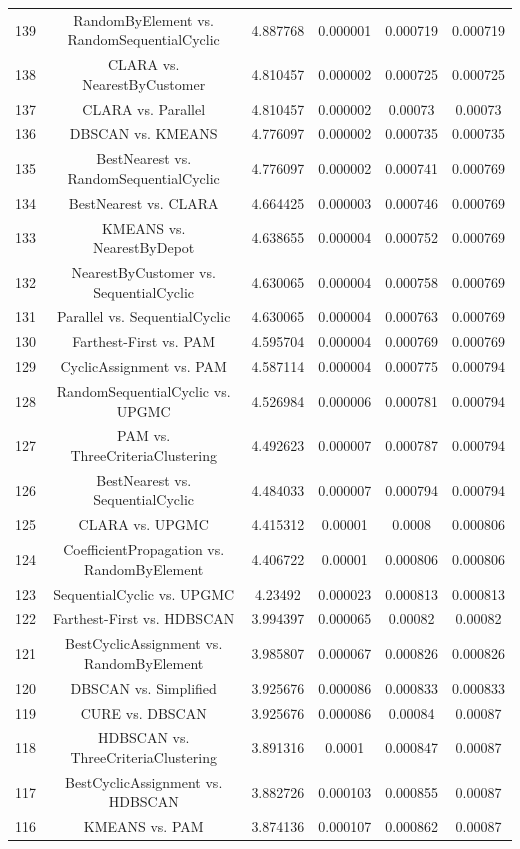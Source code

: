\documentclass[a4paper,10pt]{article}
\begin{document}
\begin{landscape}
\begin{table}[!htp]
\begin{tabular}{cccccc}
139&RandomByElement vs. RandomSequentialCyclic&4.887768&0.000001&0.000719&0.000719\\
138&CLARA vs. NearestByCustomer&4.810457&0.000002&0.000725&0.000725\\
137&CLARA vs. Parallel&4.810457&0.000002&0.00073&0.00073\\
136&DBSCAN vs. KMEANS&4.776097&0.000002&0.000735&0.000735\\
135&BestNearest vs. RandomSequentialCyclic&4.776097&0.000002&0.000741&0.000769\\
134&BestNearest vs. CLARA&4.664425&0.000003&0.000746&0.000769\\
133&KMEANS vs. NearestByDepot&4.638655&0.000004&0.000752&0.000769\\
132&NearestByCustomer vs. SequentialCyclic&4.630065&0.000004&0.000758&0.000769\\
131&Parallel vs. SequentialCyclic&4.630065&0.000004&0.000763&0.000769\\
130&Farthest-First vs. PAM&4.595704&0.000004&0.000769&0.000769\\
129&CyclicAssignment vs. PAM&4.587114&0.000004&0.000775&0.000794\\
128&RandomSequentialCyclic vs. UPGMC&4.526984&0.000006&0.000781&0.000794\\
127&PAM vs. ThreeCriteriaClustering&4.492623&0.000007&0.000787&0.000794\\
126&BestNearest vs. SequentialCyclic&4.484033&0.000007&0.000794&0.000794\\
125&CLARA vs. UPGMC&4.415312&0.00001&0.0008&0.000806\\
124&CoefficientPropagation vs. RandomByElement&4.406722&0.00001&0.000806&0.000806\\
123&SequentialCyclic vs. UPGMC&4.23492&0.000023&0.000813&0.000813\\
122&Farthest-First vs. HDBSCAN&3.994397&0.000065&0.00082&0.00082\\
121&BestCyclicAssignment vs. RandomByElement&3.985807&0.000067&0.000826&0.000826\\
120&DBSCAN vs. Simplified&3.925676&0.000086&0.000833&0.000833\\
119&CURE vs. DBSCAN&3.925676&0.000086&0.00084&0.00087\\
118&HDBSCAN vs. ThreeCriteriaClustering&3.891316&0.0001&0.000847&0.00087\\
117&BestCyclicAssignment vs. HDBSCAN&3.882726&0.000103&0.000855&0.00087\\
116&KMEANS vs. PAM&3.874136&0.000107&0.000862&0.00087\\

\end{tabular}
\end{table}
\end{landscape}
\end{document}
